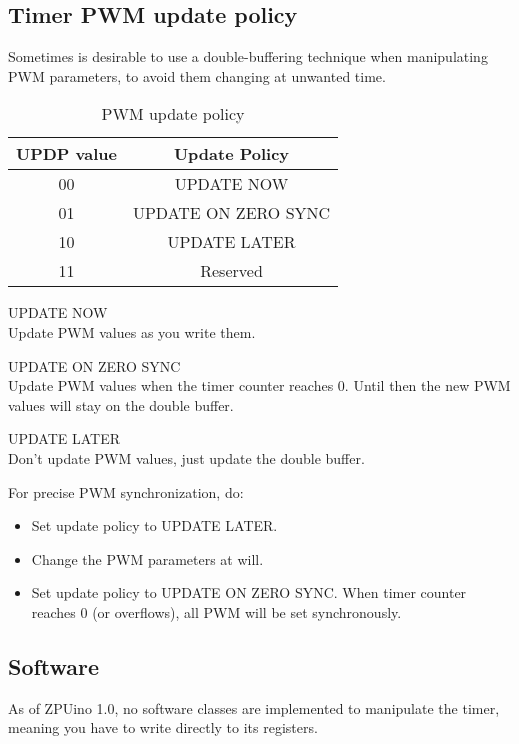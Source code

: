 \subsection{Timer PWM update policy}
Sometimes is desirable to use a double-buffering technique when manipulating PWM parameters, to avoid 
them changing at unwanted time.

\begin{table}[H]
\begin{center}    
\begin{tabular}{|c|c|}
\hline
UPDP value & Update Policy \\
\hline
00 & UPDATE NOW \\
\hline
01 & UPDATE ON ZERO SYNC \\
\hline
10 & UPDATE LATER \\
\hline
11 & Reserved \\
\hline
\end{tabular}
\caption{PWM update policy}\label{updatepolicy}
\end{center}
\end{table}

\begin{description}
\item{UPDATE NOW} \hfill \\
Update PWM values as you write them.
\item{UPDATE ON ZERO SYNC} \hfill \\
Update PWM values when the timer counter reaches 0. Until then the new PWM values will stay on the double buffer.
\item{UPDATE LATER} \hfill \\
Don't update PWM values, just update the double buffer.
\end{description}

For precise PWM synchronization, do:
\begin{itemize}
\item Set update policy to UPDATE LATER. 
\item Change the PWM parameters at will.
\item Set update policy to UPDATE ON ZERO SYNC. When timer counter reaches 0 (or overflows), all PWM will be set synchronously.
\end{itemize}

\subsection{Software}\label{timersoftware}
As of ZPUino 1.0, no software classes are implemented to manipulate the timer, meaning you have to write directly to its registers. \\
